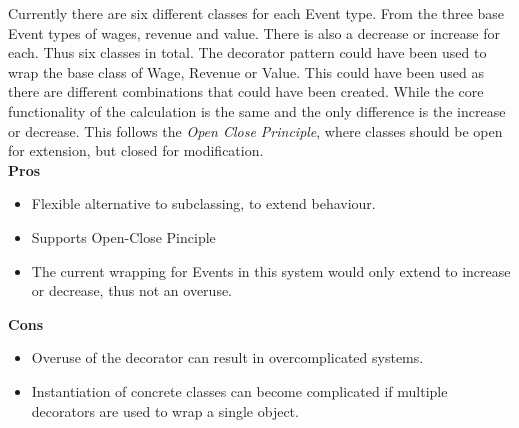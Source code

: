 \documentclass{worksheet}
\begin{document}
	
	
	Currently there are six different classes for each Event type. From the three base Event types of wages, revenue and value. There is also a decrease or increase for each. Thus six classes in total. The decorator pattern could have been used to wrap the base class of Wage, Revenue or Value. This could have been used as there are different combinations that could have been created. While the core functionality of the calculation is the same and the only difference is the increase or decrease.  This follows the \textit{Open Close Principle}, where classes should be open for extension, but closed for modification.   \\
	
	
	\textbf{Pros}
	\begin{itemize}
		\item Flexible alternative to subclassing, to extend behaviour.
		\item Supports Open-Close Pinciple
		\item The current wrapping for Events in this system would only extend to increase or decrease, thus not an overuse.
	\end{itemize}
	\textbf{Cons}
	\begin{itemize}
		\item Overuse of the decorator can result in overcomplicated systems.
		\item Instantiation of concrete classes can become complicated if multiple decorators are used to wrap a single object.
	\end{itemize}


\end{document}
